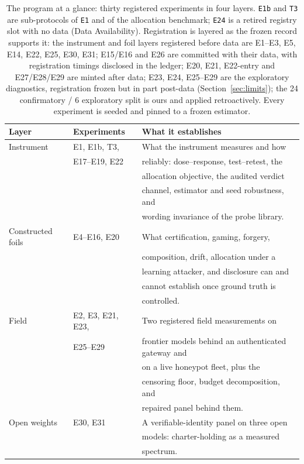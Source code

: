 \begin{table}[t]
\centering\footnotesize
\caption{The program at a glance: thirty registered experiments in four
layers. \texttt{E1b} and \texttt{T3} are sub-protocols of \texttt{E1} and of
the allocation benchmark; \texttt{E24} is a retired registry slot with no
data (Data Availability). Registration is layered as the frozen record
supports it: the instrument and foil layers registered before data are
E1--E3, E5, E14, E22, E25, E30, E31; E15/E16 and E26 are committed with
their data, with registration timings disclosed in the ledger; E20,
E21, E22-entry and E27/E28/E29 are minted after data; E23, E24, E25--E29
are the exploratory diagnostics, registration frozen but in part post-data
(Section~\ref{sec:limits}); the 24 confirmatory / 6 exploratory split is
ours and applied retroactively. Every experiment is seeded and pinned to a
frozen estimator.}
\label{tab:program}
\setlength{\tabcolsep}{4pt}
\begin{tabular}{@{}p{}p{}p{}@{}}
\toprule
Layer & Experiments & What it establishes \\
\midrule
Instrument & E1, E1b, T3, & What the instrument measures and how \\
 & E17--E19, E22 & reliably: dose--response, test--retest, the \\
 & & allocation objective, the audited verdict \\
 & & channel, estimator and seed robustness, and \\
 & & wording invariance of the probe library. \\
Constructed foils & E4--E16, E20 & What certification, gaming, forgery, \\
 & & composition, drift, allocation under a \\
 & & learning attacker, and disclosure can and \\
 & & cannot establish once ground truth is \\
 & & controlled. \\
Field & E2, E3, E21, E23, & Two registered field measurements on \\
 & E25--E29 & frontier models behind an authenticated gateway and \\
 & & on a live honeypot fleet, plus the \\
 & & censoring floor, budget decomposition, and \\
 & & repaired panel behind them. \\
Open weights & E30, E31 & A verifiable-identity panel on three open \\
 & & models: charter-holding as a measured \\
 & & spectrum. \\
\bottomrule
\end{tabular}
\end{table}

